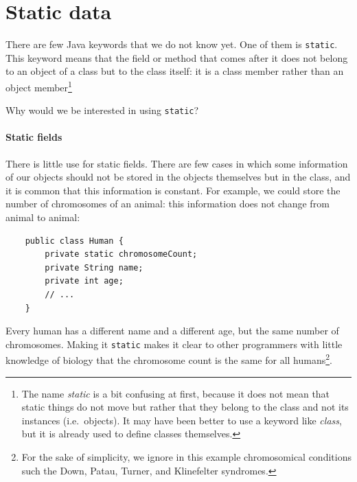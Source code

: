 %

\section{Static data}
\label{sec:static-data}

There are few Java keywords that we do not know yet. One of them is
\verb+static+. This keyword means that the field or method that comes
after it does not belong to an object of a class but to the class
itself: it is a class member rather than an object member\footnote{The
name \emph{static} is a bit confusing at first, because it does not
mean that static things do not move but rather that they belong to the
class and not its instances (i.e.~objects). It may have been better to
use a keyword like \emph{class}, but it is already used to define
classes themselves.}

Why would we be interested in using \verb+static+? 

\paragraph{Static fields}
\label{sec:static-fields}

There is little use for static fields. There are few cases in which
some information of our objects should not be stored in the objects
themselves but in the class, and it is common that this information is
constant. For example, we could store the number of chromosomes of an
animal: this information does not change from animal to animal:

\begin{verbatim}
    public class Human {
        private static chromosomeCount;
        private String name;
        private int age;
        // ...
    }
\end{verbatim}

Every human has a different name and a different age, but the same
number of chromosomes. Making it \verb+static+ makes it clear to other
programmers with little knowledge of biology that the chromosome count
is the same for all humans\footnote{For the sake of simplicity, we
  ignore in this example chromosomical conditions such the Down,
  Patau, Turner, and Klinefelter syndromes.}. 


